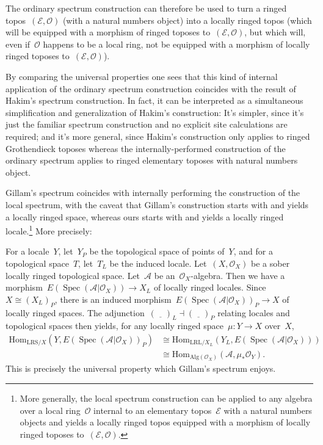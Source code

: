 \documentclass[10pt,reqno,a4paper]{amsbook}
\theoremstyle{definition}
\theoremstyle{plain}
\theoremstyle{remark}
\newcommand{\A}{\mathcal{A}}
\newcommand{\E}{\mathcal{E}}
\renewcommand{\O}{\mathcal{O}}
\newcommand{\Hom}{\mathrm{Hom}}
\newcommand{\placeholder}{\underline{\quad}}
\newcommand{\Alg}{\mathrm{Alg}}
\newcommand{\LRL}{\mathrm{LRL}}
\newcommand{\LRS}{\mathrm{LRS}}
\DeclareMathOperator{\Spec}{Spec}
\newcommand{\?}{\,{:}\,}
\renewcommand{\_}{\mathpunct{.}\,}
\begin{document}
The ordinary spectrum construction can therefore be used to turn a ringed
topos~$(\E,\O)$ (with a natural numbers object) into a locally ringed topos
(which will be equipped with a morphism of ringed toposes to~$(\E,\O)$, but
which will, even if~$\O$ happens to be a local ring, not be equipped with a
morphism of locally ringed toposes to~$(\E,\O)$).

By comparing the universal properties one sees that this kind of internal
application of the ordinary spectrum construction coincides with the result of
Hakim's spectrum construction. In fact, it can be interpreted as a simultaneous
simplification and generalization of Hakim's construction: It's simpler, since
it's just the familiar spectrum construction and no explicit site calculations
are required; and it's more general, since Hakim's construction only applies to
ringed Grothendieck toposes whereas the internally-performed construction of
the ordinary spectrum applies to ringed elementary toposes with natural numbers
object.

Gillam's spectrum coincides with internally performing the construction of the
local spectrum, with the caveat that Gillam's construction starts with and
yields a locally ringed space, whereas ours starts with and yields a locally
ringed locale.\footnote{More generally, the local spectrum construction can be
applied to any algebra over a local ring~$\O$ internal to an elementary
topos~$\E$ with a natural numbers objects and yields a locally ringed topos
equipped with a morphism of locally ringed toposes to~$(\E,\O)$.} More
precisely:

For a locale~$Y$, let~$Y_P$ be the topological space of points of~$Y$, and for
a topological space~$T$, let~$T_L$ be the induced locale.  Let~$(X,\O_X)$ be a
sober locally ringed topological space. Let~$\A$ be an~$\O_X$-algebra. Then we
have a morphism~$E(\Spec(\A|\O_X)) \to X_L$ of locally ringed locales.
Since~$X \cong (X_L)_P$, there is an induced morphism~$E(\Spec(\A|\O_X))_P \to X$ of
locally ringed spaces. The adjunction~$(\placeholder)_L \dashv
(\placeholder)_P$ relating locales and topological spaces then yields, for any
locally ringed space~$\mu : Y \to X$ over~$X$,
\begin{align*}
  \Hom_{\LRS/X}(Y, E(\Spec(\A|\O_X))_P) &\cong
  \Hom_{\LRL/X_L}(Y_L, E(\Spec(\A|\O_X))) \\
  &\cong \Hom_{\Alg(\O_X)}(\A, \mu_*\O_Y).
\end{align*}
This is precisely the universal property which Gillam's spectrum enjoys.
\end{document}
